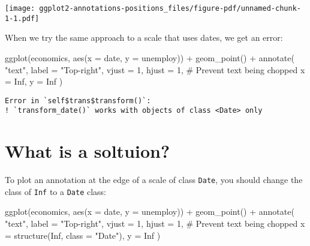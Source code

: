 \documentclass[
  letterpaper,
  DIV=11,
  numbers=noendperiod]{scrreprt}
\newenvironment{Shaded}{\begin{snugshade}}{\end{snugshade}}
\newcommand{\AttributeTok}[1]{\textcolor[rgb]{0.40,0.45,0.13}{#1}}
\newcommand{\CommentTok}[1]{\textcolor[rgb]{0.37,0.37,0.37}{#1}}
\newcommand{\ConstantTok}[1]{\textcolor[rgb]{0.56,0.35,0.01}{#1}}
\newcommand{\DecValTok}[1]{\textcolor[rgb]{0.68,0.00,0.00}{#1}}
\newcommand{\FunctionTok}[1]{\textcolor[rgb]{0.28,0.35,0.67}{#1}}
\newcommand{\NormalTok}[1]{\textcolor[rgb]{0.00,0.23,0.31}{#1}}
\newcommand{\SpecialCharTok}[1]{\textcolor[rgb]{0.37,0.37,0.37}{#1}}
\newcommand{\StringTok}[1]{\textcolor[rgb]{0.13,0.47,0.30}{#1}}
\begin{document}
\texttt{[image: ggplot2-annotations-positions\_files/figure-pdf/unnamed-chunk-1-1.pdf]}

When we try the same approach to a scale that uses dates, we get an
error:

\begin{Shaded}
\begin{Highlighting}[]
\FunctionTok{ggplot}\NormalTok{(economics, }\FunctionTok{aes}\NormalTok{(}\AttributeTok{x =}\NormalTok{ date, }\AttributeTok{y =}\NormalTok{ unemploy)) }\SpecialCharTok{+}
  \FunctionTok{geom\_point}\NormalTok{() }\SpecialCharTok{+}
  \FunctionTok{annotate}\NormalTok{(}
    \StringTok{"text"}\NormalTok{,}
    \AttributeTok{label =} \StringTok{"Top{-}right"}\NormalTok{,}
    \AttributeTok{vjust =} \DecValTok{1}\NormalTok{, }\AttributeTok{hjust =} \DecValTok{1}\NormalTok{, }\CommentTok{\# Prevent text being chopped}
    \AttributeTok{x =} \ConstantTok{Inf}\NormalTok{, }\AttributeTok{y =} \ConstantTok{Inf}
\NormalTok{  )}
\end{Highlighting}
\end{Shaded}

\begin{verbatim}
Error in `self$trans$transform()`:
! `transform_date()` works with objects of class <Date> only
\end{verbatim}

\section{What is a soltuion?}\label{what-is-a-soltuion}

To plot an annotation at the edge of a scale of class \texttt{Date}, you
should change the class of \texttt{Inf} to a \texttt{Date} class:

\begin{Shaded}
\begin{Highlighting}[]
\FunctionTok{ggplot}\NormalTok{(economics, }\FunctionTok{aes}\NormalTok{(}\AttributeTok{x =}\NormalTok{ date, }\AttributeTok{y =}\NormalTok{ unemploy)) }\SpecialCharTok{+}
  \FunctionTok{geom\_point}\NormalTok{() }\SpecialCharTok{+}
  \FunctionTok{annotate}\NormalTok{(}
    \StringTok{"text"}\NormalTok{,}
    \AttributeTok{label =} \StringTok{"Top{-}right"}\NormalTok{,}
    \AttributeTok{vjust =} \DecValTok{1}\NormalTok{, }\AttributeTok{hjust =} \DecValTok{1}\NormalTok{, }\CommentTok{\# Prevent text being chopped}
    \AttributeTok{x =} \FunctionTok{structure}\NormalTok{(}\ConstantTok{Inf}\NormalTok{, }\AttributeTok{class =} \StringTok{"Date"}\NormalTok{), }\AttributeTok{y =} \ConstantTok{Inf}
\NormalTok{  )}
\end{Highlighting}
\end{Shaded}
\end{document}
